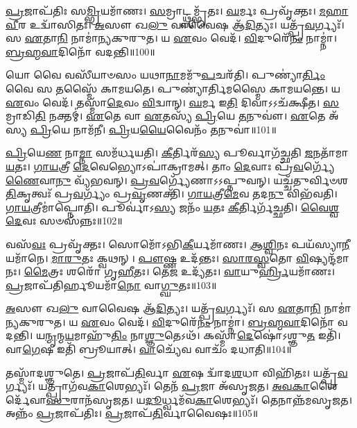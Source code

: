 \-\ul{𑌪𑍍𑌰}\-𑌜𑌾𑌪᳴𑌤𑌿𑌃 𑌸\-\ul{𑌮𑍍𑌭𑍍𑌰𑌿}\-𑌯𑌮𑌾᳴𑌣𑌃। 
\-\ul{𑌸}\-𑌮𑍍𑌰𑌾𑌟𑍍𑌥𑍍𑌸𑌮𑍍𑌭𑍃᳴𑌤𑌃। 
\-\ul{𑌘}\-𑌰𑍍𑌮𑌃 𑌪𑍍𑌰𑌵𑍃᳴𑌕𑍍𑌤𑌃। 
\-\ul{𑌮}\-\-\ul{𑌹𑌾}\-\-\ul{𑌵𑍀}\-𑌰 𑌉𑌦𑍍𑌵𑌾᳴𑌸𑌿𑌤𑌃। 
\-\ul{𑌅}\-𑌸𑍗 𑌖\-\ul{𑌲𑍁} 𑌵𑌾𑌵𑍈𑌷 𑌆᳴\-\ul{𑌦𑌿}\-𑌤𑍍𑌯𑌃। 
𑌯𑌤𑍍𑌪𑍍𑌰᳴\-\ul{𑌵}\-𑌰𑍍𑌗𑍍𑌯𑌃᳴। 
𑌸 \ul{𑌏}\-𑌤𑌾\-\ul{𑌨𑌿} 𑌨𑌾𑌮𑌾॑𑌨𑍍𑌯𑌕𑍁𑌰𑍁𑌤। 
𑌯 \ul{𑌏}\-𑌵𑌂 𑌵𑍇𑌦᳴। 
\-\ul{𑌵𑌿}\-𑌦𑍁𑌰𑍇᳴\-\ul{𑌨𑌂} 𑌨𑌾𑌮𑍍𑌨𑌾॑। 
\-\ul{𑌬𑍍𑌰}\-\-\ul{𑌹𑍍𑌮}\-\-\ul{𑌵𑌾}\-𑌦𑌿𑌨𑍋᳴ 𑌵𑌦𑌨𑍍𑌤𑌿॥100॥

𑌯𑍋 𑌵𑍈 𑌵𑌸𑍀᳴𑌯𑌾𑍞𑌸𑌂 𑌯𑌥𑌾\-\ul{𑌨𑌾}\-𑌮𑌮𑍁᳴\-\ul{𑌪}\-𑌚𑌰᳴𑌤𑌿। 
𑌪𑍁𑌣𑍍𑌯𑌾॑\-\ul{𑌰𑍍𑌤𑌿𑌂} 𑌵𑍈 𑌸 𑌤𑌸𑍍𑌮𑍈᳴ 𑌕𑌾𑌮𑌯𑌤𑍇। 
𑌪𑍁𑌣𑍍𑌯𑌾॑𑌰𑍍𑌤𑌿𑌮𑌸𑍍𑌮𑍈 𑌕𑌾𑌮𑌯𑌨𑍍𑌤𑍇। 
𑌯 \ul{𑌏}\-𑌵𑌂 𑌵𑍇𑌦᳴। 
𑌤𑌸𑍍𑌮𑌾᳴\-\ul{𑌦𑍇}\-𑌵𑌂  \ul{𑌵𑌿}\-𑌦𑍍𑌵𑌾𑌨𑍍। 
\-\ul{𑌘}\-𑌰𑍍𑌮 𑌇\-\ul{𑌤𑌿} 𑌦𑌿𑌵𑌾𑌽𑌽𑌚᳴𑌕𑍍𑌷𑍀𑌤। 
\-\ul{𑌸}\-𑌮𑍍𑌰𑌾𑌡𑌿\-\ul{𑌤𑌿} 𑌨𑌕𑍍𑌤𑌮𑍍॑। 
\-\ul{𑌏}\-𑌤𑍇 𑌵𑌾 \ul{𑌏}\-𑌤𑌸𑍍𑌯᳴ \ul{𑌪𑍍𑌰𑌿}\-𑌯𑍇 \ul{𑌤}\-𑌨𑍁𑌵𑍗॑। 
\-\ul{𑌏}\-𑌤𑍇 𑌅᳴𑌸𑍍𑌯 \ul{𑌪𑍍𑌰𑌿}\-𑌯𑍇 𑌨𑌾𑌮᳴𑌨𑍀। 
\-\ul{𑌪𑍍𑌰𑌿}\-𑌯\-\ul{𑌯𑍈}\-𑌵𑍈𑌨𑌂᳴ \ul{𑌤}\-𑌨𑍁𑌵𑌾॑॥101॥

\-\ul{𑌪𑍍𑌰𑌿}\-𑌯𑍇\-\ul{𑌣} 𑌨𑌾\-\ul{𑌮𑍍𑌨𑌾} 𑌸𑌮᳴𑌰𑍍𑌧𑌯𑌤𑌿। 
\-\ul{𑌕𑍀}\-𑌰𑍍𑌤𑌿𑌰᳴\-\ul{𑌸𑍍𑌯} 𑌪𑍂𑌰𑍍𑌵𑌾𑌗᳴𑌚𑍍𑌛𑌤𑌿 \ul{𑌜}\-𑌨𑌤𑌾᳴𑌮𑌾\-\ul{𑌯}\-𑌤𑌃। 
\-\ul{𑌗𑌾}\-\-\ul{𑌯}\-𑌤𑍍𑌰𑍀 \ul{𑌦𑍇}\-𑌵𑍇𑌭𑍍𑌯𑍋𑌽𑌪𑌾॑𑌕𑍍𑌰𑌾𑌮𑌤𑍍। 
𑌤𑌾𑌂 \ul{𑌦𑍇}\-𑌵𑌾𑌃 𑌪𑍍𑌰᳴\-\ul{𑌵}\-𑌰𑍍𑌗𑍍𑌯𑍇᳴\-\ul{𑌣𑍈}\-𑌵𑌾\-\ul{𑌨𑍁} 𑌵𑍍𑌯᳴𑌭𑌵𑌨𑍍। 
\-\ul{𑌪𑍍𑌰}\-\-\ul{𑌵}\-𑌰𑍍𑌗𑍍𑌯𑍇᳴𑌣𑌾𑌽𑌽𑌪𑍍𑌨𑍁𑌵𑌨𑍍। 
𑌯𑌚𑍍𑌚᳴𑌤𑍁𑌰𑍍𑌵𑌿𑍞𑌶\-\ul{𑌤𑌿}\-𑌕𑍃𑌤𑍍𑌵𑌃᳴ 𑌪𑍍𑌰\-\ul{𑌵}\-𑌰𑍍𑌗𑍍𑌯𑌂᳴ 𑌪𑍍𑌰\-\ul{𑌵𑍃}\-𑌣𑌕𑍍𑌤𑌿᳴। 
\-\ul{𑌗𑌾}\-\-\ul{𑌯}\-𑌤𑍍𑌰𑍀\-\ul{𑌮𑍇}\-𑌵 𑌤𑌦\-\ul{𑌨𑍁} 𑌵𑌿𑌭᳴𑌵𑌤𑌿। 
\-\ul{𑌗𑌾}\-\-\ul{𑌯}\-𑌤𑍍𑌰𑍀𑌮𑌾॑𑌪𑍍𑌨𑍋𑌤𑌿। 
𑌪𑍂𑌰𑍍𑌵𑌾॑𑌽\-\ul{𑌸𑍍𑌯} 𑌜𑌨𑌂᳴ \ul{𑌯}\-𑌤𑌃 \ul{𑌕𑍀}\-𑌰𑍍𑌤𑌿𑌰𑍍𑌗᳴𑌚𑍍𑌛𑌤𑌿। 
\-\ul{𑌵𑍈}\-\-\ul{𑌶𑍍𑌵}\-\-\ul{𑌦𑍇}\-𑌵𑌃 𑌸𑍞𑌸᳴𑌨𑍍𑌨𑌃॥102॥

𑌵𑌸᳴\-\ul{𑌵𑌃} 𑌪𑍍𑌰𑌵𑍃᳴𑌕𑍍𑌤𑌃। 
𑌸𑍋𑌮𑍋᳴𑌽𑌭𑌿\-\ul{𑌕𑍀}\-𑌰𑍍𑌯𑌮𑌾᳴𑌣𑌃। 
\-\ul{𑌆}\-\-\ul{𑌶𑍍𑌵𑌿}\-𑌨𑌃 𑌪𑌯᳴𑌸𑍍𑌯𑌾\-\ul{𑌨𑍀}\-𑌯\-𑌮𑌾᳴𑌨𑍇। 
\-\ul{𑌮𑌾}\-\-\ul{𑌰𑍁}\-𑌤𑌃 𑌕𑍍𑌵𑌥𑌨𑍍। 
\-\ul{𑌪𑍗}\-𑌷𑍍𑌣 𑌉𑌦᳴𑌨𑍍𑌤𑌃। 
\-\ul{𑌸𑌾}\-\-\ul{𑌰}\-\-\ul{𑌸𑍍𑌵}\-𑌤𑍋 \ul{𑌵𑌿}\-𑌷𑍍𑌯𑌨𑍍𑌦᳴𑌮𑌾𑌨𑌃। 
\-\ul{𑌮𑍈}\-𑌤𑍍𑌰𑌃  𑌶𑌰𑍋᳴ 𑌗𑍃\-\ul{𑌹𑍀}\-𑌤𑌃। 
𑌤𑍇\-\ul{𑌜} 𑌉𑌦𑍍𑌯᳴𑌤𑌃। 
\-\ul{𑌵𑌾}\-𑌯𑍁\-\ul{𑌰𑍍𑌹𑍍𑌰𑌿}\-𑌯𑌮𑌾᳴𑌣𑌃। 
\-\ul{𑌪𑍍𑌰}\-𑌜𑌾𑌪᳴𑌤𑌿𑌰𑍍\mbox{}\-\ul{𑌹𑍂}\-𑌯𑌮𑌾᳴\-\ul{𑌨𑍋} 𑌵𑌾\-\ul{𑌗𑍍𑌘𑍁}\-𑌤𑌃॥103॥

\-\ul{𑌅}\-𑌸𑍗 𑌖\-\ul{𑌲𑍁} 𑌵𑌾𑌵𑍈𑌷 𑌆᳴\-\ul{𑌦𑌿}\-𑌤𑍍𑌯𑌃। 
𑌯𑌤𑍍𑌪𑍍𑌰᳴\-\ul{𑌵}\-𑌰𑍍𑌗𑍍𑌯𑌃᳴। 
𑌸 \ul{𑌏}\-𑌤𑌾\-\ul{𑌨𑌿} 𑌨𑌾𑌮𑌾॑𑌨𑍍𑌯𑌕𑍁𑌰𑍁𑌤। 
𑌯 \ul{𑌏}\-𑌵𑌂 𑌵𑍇𑌦᳴। 
\-\ul{𑌵𑌿}\-𑌦𑍁𑌰𑍇᳴\-\ul{𑌨𑌂} 𑌨𑌾𑌮𑍍𑌨𑌾॑। 
\-\ul{𑌬𑍍𑌰}\-\-\ul{𑌹𑍍𑌮}\-\-\ul{𑌵𑌾}\-𑌦𑌿𑌨𑍋᳴ 𑌵𑌦𑌨𑍍𑌤𑌿। 
𑌯\-\ul{𑌨𑍍𑌮𑍃}\-𑌨𑍍𑌮\-\ul{𑌯}\-𑌮𑌾𑌹𑍁᳴\-\ul{𑌤𑌿𑌂} 𑌨𑌾\-\ul{𑌶𑍍𑌞𑍁}\-𑌤𑍇𑌽𑌥᳴। 
𑌕𑌸𑍍𑌮𑌾᳴\-\ul{𑌦𑍇}\-𑌷𑍋॑𑌽𑌶𑍍𑌞𑍁\-\ul{𑌤} 𑌇𑌤𑌿᳴। 
𑌵𑌾\-\ul{𑌗𑍇}\-𑌷 𑌇𑌤𑌿᳴ 𑌬𑍍𑌰𑍂𑌯𑌾𑌤𑍍। 
\-\ul{𑌵𑌾}\-𑌚𑍍𑌯𑍇᳴𑌵 𑌵𑌾𑌚𑌂᳴ 𑌦𑌧𑌾𑌤𑌿॥104॥

𑌤𑌸𑍍𑌮𑌾᳴𑌦𑌶𑍍𑌞𑍁𑌤𑍇। 
\-\ul{𑌪𑍍𑌰}\-𑌜𑌾𑌪᳴\-\ul{𑌤𑌿}\-𑌰𑍍𑌵𑌾 \ul{𑌏}\-𑌷 𑌦𑍍𑌵𑌾᳴𑌦\-\ul{𑌶}\-𑌧𑌾 𑌵𑌿𑌹𑌿᳴𑌤𑌃। 
𑌯𑌤𑍍𑌪𑍍𑌰᳴\-\ul{𑌵}\-𑌰𑍍𑌗𑍍𑌯𑌃᳴। 
𑌯𑌤𑍍𑌪𑍍𑌰𑌾𑌗᳴𑌵\-\ul{𑌕𑌾}\-𑌶𑍇𑌭𑍍𑌯𑌃᳴। 
𑌤𑍇𑌨᳴ \ul{𑌪𑍍𑌰}\-𑌜𑌾 𑌅᳴𑌸𑍃𑌜𑌤। 
\-\ul{𑌅}\-\-\ul{𑌵}\-\-\ul{𑌕𑌾}\-𑌶𑍈𑌰𑍍𑌦𑍇᳴𑌵𑌾\-\ul{𑌸𑍁}\-𑌰𑌾𑌨᳴𑌸𑍃𑌜𑌤। 
𑌯\-\ul{𑌦𑍂}\-𑌰𑍍𑌧𑍍𑌵𑌮᳴𑌵\-\ul{𑌕𑌾}\-𑌶𑍇𑌭𑍍𑌯𑌃᳴। 
𑌤𑍇𑌨𑌾𑌨𑍍𑌨᳴𑌮\-𑌸𑍃𑌜𑌤। 
𑌅𑌨𑍍𑌨𑌂᳴ \ul{𑌪𑍍𑌰}\-𑌜𑌾𑌪᳴𑌤𑌿𑌃। 
\-\ul{𑌪𑍍𑌰}\-𑌜𑌾𑌪᳴\-\ul{𑌤𑌿}\-𑌰𑍍𑌵𑌾𑌵𑍈𑌷𑌃॥105॥
\anuvakamend[\-\ul{𑌵}\-\-\ul{𑌦}\-\-\ul{𑌨𑍍𑌤𑌿} \ul{𑌤}\-𑌨𑍁\-\ul{𑌵𑌾} 𑌸𑍞𑌸᳴𑌨𑍍𑌨𑍋 \ul{𑌹𑍂}\-𑌯𑌮𑌾᳴\-\ul{𑌨𑍋} 𑌵𑌾\-\ul{𑌗𑍍𑌘𑍁}\-𑌤𑍋 𑌦᳴𑌧𑌾\-\ul{𑌤𑍍𑌯𑍇}\-𑌷𑌃]

